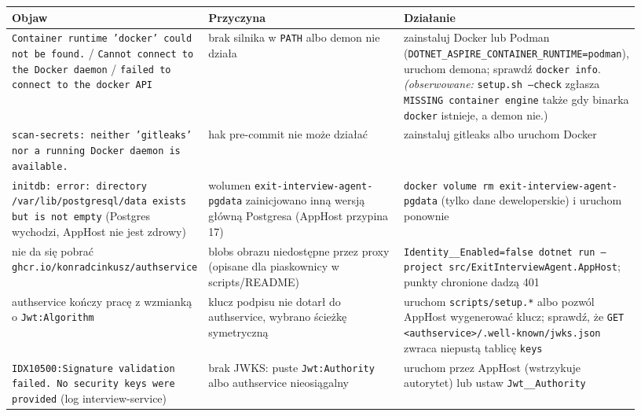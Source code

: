 {\begin{center}
\scriptsize
\begin{longtable}{@{}>{\raggedright\arraybackslash}p{0.29\linewidth}>{\raggedright\arraybackslash}p{0.32\linewidth}>{\raggedright\arraybackslash}p{0.32\linewidth}@{}}
\toprule
Objaw & Przyczyna & Działanie \\
\midrule
\endhead
\texttt{Container runtime 'docker' could not be found.} / \texttt{Cannot connect to the Docker daemon} / \texttt{failed to connect to the docker API} & brak silnika w \texttt{PATH} albo demon nie działa & zainstaluj Docker lub Podman (\texttt{DOTNET\_\allowbreak{}ASPIRE\_\allowbreak{}CONTAINER\_\allowbreak{}RUNTIME=podman}), uruchom demona; sprawdź \texttt{docker info}. \emph{(obserwowane:} \texttt{setup.\allowbreak{}sh --check} zgłasza \texttt{MISSING container engine} także gdy binarka \texttt{docker} istnieje, a demon nie.) \\
\texttt{scan-\allowbreak{}secrets: neither 'gitleaks' nor a running Docker daemon is available.} & hak pre-commit nie może działać & zainstaluj gitleaks albo uruchom Docker \\
\texttt{initdb: error: directory /var/\allowbreak{}lib/\allowbreak{}postgresql/\allowbreak{}data exists but is not empty} (Postgres wychodzi, AppHost nie jest zdrowy) & wolumen \texttt{exit-\allowbreak{}interview-\allowbreak{}agent-\allowbreak{}pgdata} zainicjowano inną wersją główną Postgresa (AppHost przypina 17) & \texttt{docker volume rm exit-\allowbreak{}interview-\allowbreak{}agent-\allowbreak{}pgdata} (tylko dane deweloperskie) i uruchom ponownie \\
nie da się pobrać \texttt{ghcr.\allowbreak{}io/\allowbreak{}konradcinkusz/\allowbreak{}authservice} & blobs obrazu niedostępne przez proxy (opisane dla piaskownicy w scripts/README) & \texttt{Identity\_\allowbreak{}\_\allowbreak{}Enabled=false dotnet run --project src/\allowbreak{}ExitInterviewAgent.\allowbreak{}AppHost}; punkty chronione dadzą 401 \\
authservice kończy pracę z wzmianką o \texttt{Jwt:Algorithm} & klucz podpisu nie dotarł do authservice, wybrano ścieżkę symetryczną & uruchom \texttt{scripts/setup.*} albo pozwól AppHost wygenerować klucz; sprawdź, że \texttt{GET <authservice>/\allowbreak{}.well-\allowbreak{}known/\allowbreak{}jwks.\allowbreak{}json} zwraca niepustą tablicę \texttt{keys} \\
\texttt{IDX10500:\allowbreak{}Signature validation failed. No security keys were provided} (log interview-service) & brak JWKS: puste \texttt{Jwt:Authority} albo authservice nieosiągalny & uruchom przez AppHost (wstrzykuje autorytet) lub ustaw \texttt{Jwt\_\allowbreak{}\_\allowbreak{}Authority} \\

\end{longtable}
\end{center}}
